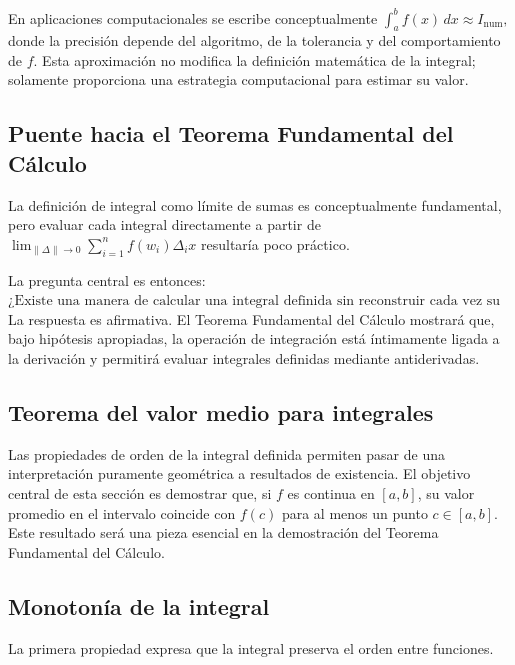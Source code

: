 \documentclass[12pt]{article}
\begin{document}
En aplicaciones computacionales se escribe conceptualmente
$
\int_a^b f(x)\,dx\approx I_{\mathrm{num}},
$
donde la precisión depende del algoritmo, de la tolerancia y del comportamiento
de $f$. Esta aproximación no modifica la definición matemática de la integral;
solamente proporciona una estrategia computacional para estimar su valor.
\subsection*{Puente hacia el Teorema Fundamental del Cálculo}
La definición de integral como límite de sumas es conceptualmente fundamental,
pero evaluar cada integral directamente a partir de
$
\lim_{\|\Delta\|\to0}\sum_{i=1}^n f(w_i)\Delta_i x
$
resultaría poco práctico.

La pregunta central es entonces:
$
\boxed{
\text{¿Existe una manera de calcular una integral definida sin reconstruir cada vez su suma de Riemann?}
}
$
La respuesta es afirmativa. El Teorema Fundamental del Cálculo mostrará que,
bajo hipótesis apropiadas, la operación de integración está íntimamente ligada
a la derivación y permitirá evaluar integrales definidas mediante
antiderivadas.


\subsection*{Teorema del valor medio para integrales}
Las propiedades de orden de la integral definida permiten pasar de una
interpretación puramente geométrica a resultados de existencia. El objetivo
central de esta sección es demostrar que, si $f$ es continua en $[a,b]$, su
valor promedio en el intervalo coincide con $f(c)$ para al menos un punto
$c\in[a,b]$. Este resultado será una pieza esencial en la demostración del
Teorema Fundamental del Cálculo.
\subsection*{Monotonía de la integral}
La primera propiedad expresa que la integral preserva el orden entre
funciones.
\end{document}
